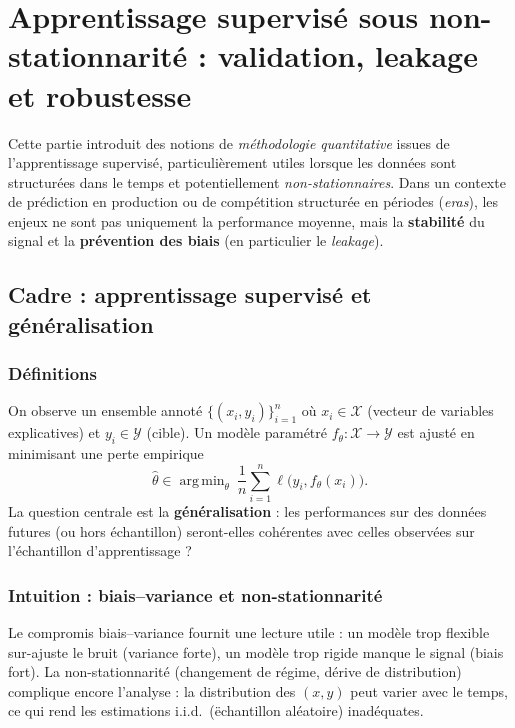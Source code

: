 \documentclass[11pt,a4paper]{article}
\newcommand{\1}{\mathbf{1}}
\DeclareMathOperator*{\argmin}{arg\,min}
\begin{document}
\section{Apprentissage supervis\'e sous non-stationnarit\'e : validation, leakage et robustesse}

Cette partie introduit des notions de \emph{m\'ethodologie quantitative} issues de l'apprentissage supervis\'e, particuli\`erement utiles
lorsque les donn\'ees sont structur\'ees dans le temps et potentiellement \emph{non-stationnaires}. Dans un contexte de pr\'ediction en production
ou de comp\'etition structur\'ee en p\'eriodes (\emph{eras}), les enjeux ne sont pas uniquement la performance moyenne, mais la \textbf{stabilit\'e}
du signal et la \textbf{pr\'evention des biais} (en particulier le \emph{leakage}).

\subsection{Cadre : apprentissage supervis\'e et g\'en\'eralisation}

\subsubsection{D\'efinitions}
On observe un ensemble annot\'e $\{(x_i,y_i)\}_{i=1}^n$ o\`u $x_i\in\mathcal{X}$ (vecteur de variables explicatives) et $y_i\in\mathcal{Y}$ (cible).
Un mod\`ele param\'etr\'e $f_\theta:\mathcal{X}\to\mathcal{Y}$ est ajust\'e en minimisant une perte empirique
\[
\widehat\theta\in\argmin_{\theta}\ \frac{1}{n}\sum_{i=1}^n \ell\bigl(y_i,f_\theta(x_i)\bigr).
\]
La question centrale est la \textbf{g\'en\'eralisation} : les performances sur des donn\'ees futures (ou hors \'echantillon) seront-elles coh\'erentes
avec celles observ\'ees sur l'\'echantillon d'apprentissage ?

\subsubsection{Intuition : biais--variance et non-stationnarit\'e}
Le compromis biais--variance fournit une lecture utile : un mod\`ele trop flexible sur-ajuste le bruit (variance forte), un mod\`ele trop rigide
manque le signal (biais fort). La non-stationnarit\'e (changement de r\'egime, d\'erive de distribution) complique encore l'analyse : la distribution
des $(x,y)$ peut varier avec le temps, ce qui rend les estimations i.i.d.\ (\"echantillon al\'eatoire) inad\'equates.
\end{document}
